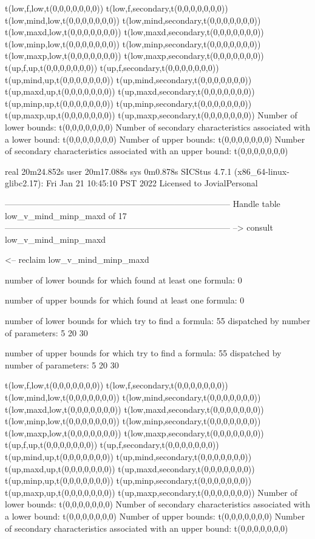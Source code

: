 t(low,f,low,t(0,0,0,0,0,0,0))
t(low,f,secondary,t(0,0,0,0,0,0,0))
t(low,mind,low,t(0,0,0,0,0,0,0))
t(low,mind,secondary,t(0,0,0,0,0,0,0))
t(low,maxd,low,t(0,0,0,0,0,0,0))
t(low,maxd,secondary,t(0,0,0,0,0,0,0))
t(low,minp,low,t(0,0,0,0,0,0,0))
t(low,minp,secondary,t(0,0,0,0,0,0,0))
t(low,maxp,low,t(0,0,0,0,0,0,0))
t(low,maxp,secondary,t(0,0,0,0,0,0,0))
t(up,f,up,t(0,0,0,0,0,0,0))
t(up,f,secondary,t(0,0,0,0,0,0,0))
t(up,mind,up,t(0,0,0,0,0,0,0))
t(up,mind,secondary,t(0,0,0,0,0,0,0))
t(up,maxd,up,t(0,0,0,0,0,0,0))
t(up,maxd,secondary,t(0,0,0,0,0,0,0))
t(up,minp,up,t(0,0,0,0,0,0,0))
t(up,minp,secondary,t(0,0,0,0,0,0,0))
t(up,maxp,up,t(0,0,0,0,0,0,0))
t(up,maxp,secondary,t(0,0,0,0,0,0,0))
Number of lower bounds:                                             t(0,0,0,0,0,0,0)
Number of secondary characteristics associated with a lower bound:  t(0,0,0,0,0,0,0)
Number of upper bounds:                                             t(0,0,0,0,0,0,0)
Number of secondary characteristics associated with an upper bound: t(0,0,0,0,0,0,0)

real	20m24.852s
user	20m17.088s
sys	0m0.878s
SICStus 4.7.1 (x86_64-linux-glibc2.17): Fri Jan 21 10:45:10 PST 2022
Licensed to JovialPersonal


--------------------------------------------------------------------------------
Handle table low_v_mind_minp_maxd of 17
--------------------------------------------------------------------------------
--> consult low_v_mind_minp_maxd

<-- reclaim low_v_mind_minp_maxd

number of lower bounds for which found at least one formula: 0

number of upper bounds for which found at least one formula: 0

number of lower bounds for which try to find a formula: 55
dispatched by number of parameters: 5  20  30

number of upper bounds for which try to find a formula: 55
dispatched by number of parameters: 5  20  30

t(low,f,low,t(0,0,0,0,0,0,0))
t(low,f,secondary,t(0,0,0,0,0,0,0))
t(low,mind,low,t(0,0,0,0,0,0,0))
t(low,mind,secondary,t(0,0,0,0,0,0,0))
t(low,maxd,low,t(0,0,0,0,0,0,0))
t(low,maxd,secondary,t(0,0,0,0,0,0,0))
t(low,minp,low,t(0,0,0,0,0,0,0))
t(low,minp,secondary,t(0,0,0,0,0,0,0))
t(low,maxp,low,t(0,0,0,0,0,0,0))
t(low,maxp,secondary,t(0,0,0,0,0,0,0))
t(up,f,up,t(0,0,0,0,0,0,0))
t(up,f,secondary,t(0,0,0,0,0,0,0))
t(up,mind,up,t(0,0,0,0,0,0,0))
t(up,mind,secondary,t(0,0,0,0,0,0,0))
t(up,maxd,up,t(0,0,0,0,0,0,0))
t(up,maxd,secondary,t(0,0,0,0,0,0,0))
t(up,minp,up,t(0,0,0,0,0,0,0))
t(up,minp,secondary,t(0,0,0,0,0,0,0))
t(up,maxp,up,t(0,0,0,0,0,0,0))
t(up,maxp,secondary,t(0,0,0,0,0,0,0))
Number of lower bounds:                                             t(0,0,0,0,0,0,0)
Number of secondary characteristics associated with a lower bound:  t(0,0,0,0,0,0,0)
Number of upper bounds:                                             t(0,0,0,0,0,0,0)
Number of secondary characteristics associated with an upper bound: t(0,0,0,0,0,0,0)

